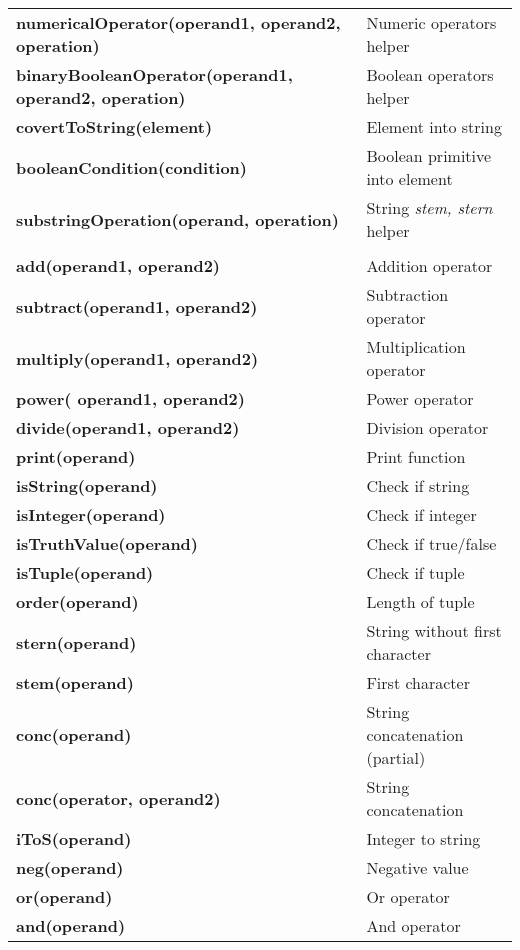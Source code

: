\documentclass[12pt,a4paper]{article}
\begin{document}
    \begin{tabular}{lp{6cm}}
        \textbf{numericalOperator(operand1, operand2, operation)} & Numeric operators helper \\
        \textbf{binaryBooleanOperator(operand1, operand2, operation)} & Boolean operators helper \\
        \textbf{covertToString(element)} & Element into string\\
        \textbf{booleanCondition(condition)} & Boolean primitive into element \\
        \textbf{substringOperation(operand, operation)} & String \textit{stem, stern} helper\\ \\
        \textbf{add(operand1, operand2)} & Addition operator \\
        \textbf{subtract(operand1, operand2)} & Subtraction operator \\
        \textbf{multiply(operand1, operand2)} & Multiplication operator \\
        \textbf{power( operand1, operand2)} & Power operator \\
        \textbf{divide(operand1, operand2)} & Division operator \\
        \textbf{print(operand)} & Print function \\
        \textbf{isString(operand)} & Check if string \\
        \textbf{isInteger(operand)} & Check if integer \\
        \textbf{isTruthValue(operand)} & Check if true/false \\
        \textbf{isTuple(operand)} & Check if tuple \\
        \textbf{order(operand)} & Length of tuple \\
        \textbf{stern(operand)} & String without first character \\
        \textbf{stem(operand)} & First character \\
        \textbf{conc(operand)} & String concatenation (partial) \\
        \textbf{conc(operator, operand2)} & String concatenation \\
        \textbf{iToS(operand)} & Integer to string \\
        \textbf{neg(operand)} & Negative value \\
        \textbf{or(operand)} & Or operator \\
        \textbf{and(operand)} & And operator \\

\end{tabular}
\end{document}
